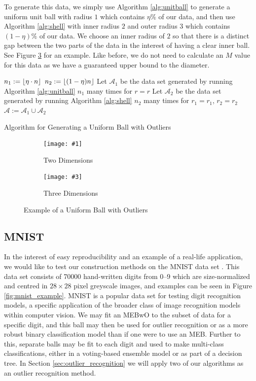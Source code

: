 \documentclass[11pt,twoside]{report}
\newcommand{\A}{\mathcal{A}} %
\newcommand{\pairfigure}[6]{
    \begin{figure}[ht]
        \centering
        \begin{subfigure}[b]{0.475\textwidth}
            \centering
            \texttt{[image: \#1]}
            \caption{#2}
            \label{#6_#2}
        \end{subfigure}
        \hfill
        \begin{subfigure}[b]{0.475\textwidth}
            \centering
            \texttt{[image: \#3]}
            \caption{#4}
            \label{#6_#4}
        \end{subfigure}
        \caption{#5}
        \label{#6}
\end{figure}
}
\newcommand{\datafigure}[3]{
    \pairfigure{data_plots/#1_2d.png}{Two Dimensions}{data_plots/#1_3d.png}{Three Dimensions}{#2}{#3}
}
\DeclarePairedDelimiter\floor{\lfloor}{\rfloor}
\theoremstyle{definition}
\numberwithin{theorem}{section}
\numberwithin{definition}{section}
\numberwithin{lemma}{section}
\numberwithin{proposition}{section}
\numberwithin{equation}{section}
\numberwithin{figure}{section}
\begin{document}
To generate this data, we simply use Algorithm \ref{alg:unitball} to generate a uniform unit ball with radius $1$ which contains $\eta\%$ of our data, and then use Algorithm \ref{alg:shell} with inner radius $2$ and outer radius $3$ which contains $(1-\eta)\%$ of our data. We choose an inner radius of $2$ so that there is a distinct gap between the two parts of the data in the interest of having a clear inner ball. See Figure \ref{fig:unifballoutliers} for an example. Like before, we do not need to calculate an $M$ value for this data as we have a guaranteed upper bound to the diameter.

\begin{algorithm}
    \KwOut{Data set $\A\subseteq\mathbb{R}^d$}
    
    $n_1:=\floor{\eta\cdot n}$\;
    $n_2:=\floor{(1-\eta)n}$\;
    Let $\A_1$ be the data set generated by running Algorithm \ref{alg:unitball} $n_1$ many times for $r=r$\;
    Let $\A_2$ be the data set generated by running Algorithm \ref{alg:shell} $n_2$ many times for $r_1=r_1$, $r_2=r_2$\;
    $\A:=\A_1\cup\A_2$\;
    \KwRet{$\A$}
    
    \caption{Algorithm for Generating a Uniform Ball with Outliers}
    \label{alg:unifballoutliers}
\end{algorithm}

\datafigure{uniform_ball_with_outliers}{Example of a Uniform Ball with Outliers}{fig:unifballoutliers}


\subsection{MNIST}

In the interest of easy reproducibility and an example of a real-life application, we would like to test our construction methods on the MNIST data set \cite{lecun2010mnist}. This data set consists of 70000 hand-written digits from 0--9 which are size-normalized and centred in $28\times28$ pixel greyscale images, and examples can be seen in Figure \ref{fig:mnist_example}. MNIST is a popular data set for testing digit recognition models, a specific application of the broader class of image recognition models within computer vision. We may fit an MEBwO to the subset of data for a specific digit, and this ball may then be used for outlier recognition or as a more robust binary classification model than if one were to use an MEB. Further to this, separate balls may be fit to each digit and used to make multi-class classifications, either in a voting-based ensemble model or as part of a decision tree. In Section \ref{sec:outlier_recognition} we will apply two of our algorithms as an outlier recognition method.
\end{document}
